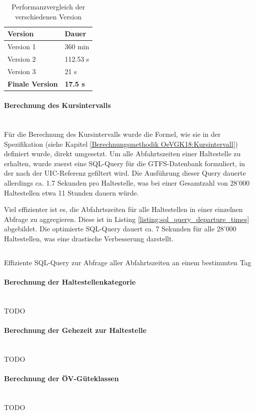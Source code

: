 \begin{table}[ht]
    \centering
    \begin{tabular}[ht]{l l}
        \toprule
        \textbf{Version} 
                                & \textbf{Dauer}\\
        \midrule
        Version 1
                                & 360 min\\
        Version 2
                                & 112.53 s\\
        Version 3
                                & 21 s\\
        \textbf{Finale Version}
                                & \textbf{17.5 s}\\            
        \bottomrule
    \end{tabular}
    \caption{Performanzvergleich der verschiedenen Version}
    \label{table:Performanzvergleich der verschiedenen Version}
\end{table}

\paragraph{Berechnung des Kursintervalls}~\\
Für die Berechnung des Kursintervalls wurde die Formel, wie sie in der Spezifikation (siehe Kapitel \ref{Berechnungsmethodik OeVGK18:Kursintervall}) definiert wurde, direkt umgesetzt.
Um alle Abfahrtszeiten einer Haltestelle zu erhalten, wurde zuerst eine SQL-Query für die GTFS-Datenbank formuliert, in der nach der \acs{UIC}-Referenz gefiltert wird.
Die Ausführung dieser Query dauerte allerdings ca. 1.7 Sekunden pro Haltestelle, was bei einer Gesamtzahl von 28'000 Haltestellen etwa 11 Stunden dauern würde.

Viel effizienter ist es, die Abfahrtszeiten für alle Haltestellen in einer einzelnen Abfrage zu aggregieren.
Diese ist in Listing \ref{listing:sql_query_departure_times} abgebildet.
Die optimierte SQL-Query dauert ca. 7 Sekunden für alle 28'000 Haltestellen, was eine drastische Verbesserung darstellt.

\begin{listing}[ht]
    \inputminted{sql}{projectdoc/listing/departure_time_cte.sql}
    \caption{Effiziente SQL-Query zur Abfrage aller Abfahrtszeiten an einem bestimmten Tag}
    \label{listing:sql_query_departure_times}
\end{listing}

\paragraph{Berechnung der Haltestellenkategorie}~\\
TODO

\paragraph{Berechnung der Gehezeit zur Haltestelle}~\\
TODO

\paragraph{Berechnung der ÖV-Güteklassen}~\\
TODO 

